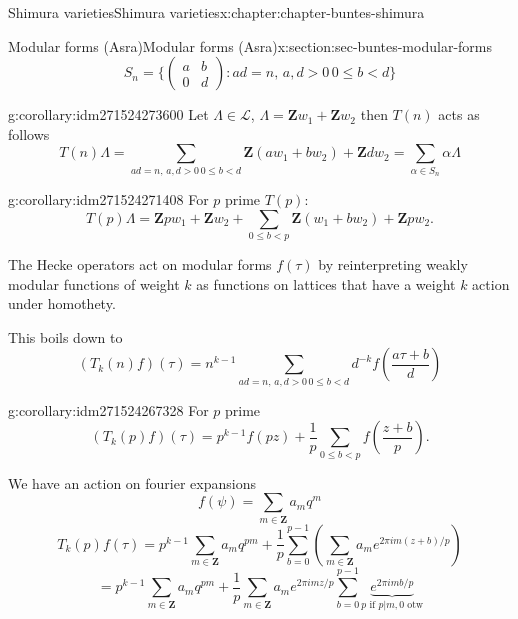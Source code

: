 \documentclass[oneside,10pt,]{book}
\numberwithin{equation}{section}
\newcommand{\ZZ}{\mathbf{Z}}
\newcommand{\lt}{<}
\newcommand{\gt}{>}
\newcommand{\amp}{&}
\begin{document}
\begin{chapterptx}{Shimura varieties}{}{Shimura varieties}{}{}{x:chapter:chapter-buntes-shimura}
\begin{sectionptx}{Modular forms (Asra)}{}{Modular forms (Asra)}{}{}{x:section:sec-buntes-modular-forms}
\begin{equation*}
S_n = \{\begin{pmatrix} a\amp b \\ 0 \amp d\end{pmatrix} : ad= n,\, a,d\gt 0\, 0\le b \lt d\}
\end{equation*}
%
\begin{corollary}{}{}{g:corollary:idm271524273600}%
Let \(\Lambda \in \mathcal L\), \(\Lambda = \ZZ w_1 + \ZZ w_2\) then  \(T(n)\) acts as follows%
\begin{equation*}
T(n) \Lambda =  \sum_{ ad= n,\, a,d\gt 0\, 0\le b \lt d} \ZZ(aw_1 + bw_2) + \ZZ dw_2 = \sum_{\alpha \in S_n} \alpha \Lambda
\end{equation*}
%
\end{corollary}
\begin{corollary}{}{}{g:corollary:idm271524271408}%
For \(p \) prime \(T(p)\):%
\begin{equation*}
T(p) \Lambda = \ZZ pw_1 + \ZZ w_2 +\sum_{0 \le b \lt p} \ZZ(w_1 + bw_2) + \ZZ pw_2\text{.}
\end{equation*}
%
\end{corollary}
The Hecke operators act on modular forms \(f(\tau)\) by reinterpreting weakly modular functions of weight \(k\) as functions on lattices that have  a weight \(k\) action under homothety.%
\par
This boils down to%
\begin{equation*}
(T_k(n) f)(\tau) = n^{k-1}  \sum_{ ad= n,\, a,d\gt 0\, 0\le b \lt d} d^{-k} f\left( \frac{ a\tau +b}{d}\right)
\end{equation*}
%
\begin{corollary}{}{}{g:corollary:idm271524267328}%
For \(p \) prime%
\begin{equation*}
(T_k(p) f)(\tau) = p^{k-1}f(pz) +\frac 1p \sum_{0 \le b  \lt p} f\left( \frac {z + b}{p} \right)\text{.}
\end{equation*}
%
\end{corollary}
We have an action on fourier expansions%
\begin{equation*}
f(\psi) = \sum_{m\in \ZZ} a_m q^m
\end{equation*}
%
\begin{equation*}
T_k(p)f(\tau) = p^{k-1} \sum_{m\in \ZZ} a_m q^{pm} + \frac{1}{p} \sum_{b=0}^{p-1}  \left( \sum_{m\in \ZZ} a_m e^{2\pi i m (z+b)/p}\right)
\end{equation*}
%
\begin{equation*}
= p^{k-1} \sum_{m\in \ZZ} a_m q^{pm} + \frac{1}{p}  \sum_{m\in \ZZ} a_me^{2\pi i m z/p} \sum_{b=0}^{p-1} \underbrace{e^{2\pi i m b/p}}_{p\text{ if }p|m,0\text{ otw}}

\end{equation*}
\end{sectionptx}
\end{chapterptx}
\end{document}
